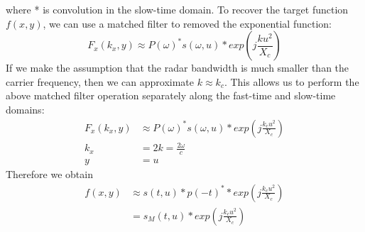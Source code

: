 \documentclass{article}
\begin{document}
where * is convolution in the slow-time domain. To recover the target function \( f(x,y) \), we can use a matched filter to removed the exponential function:
\begin{displaymath}
	F_{x}(k_{x} , y) \approx P(\omega)^{*} s(\omega , u) *exp\left(j \frac{k u^2 }{X_{c} }\right)
\end{displaymath}
If we make the assumption that the radar bandwidth is much smaller than the carrier frequency, then we can approximate \( k \approx k_{c} \). This allows us to perform the above matched filter operation separately along the fast-time and slow-time domains:
\begin{align*}
	F_{x}(k_{x} , y) &\approx P(\omega)^{*} s(\omega, u) * exp\left(j \frac{k_c u^2 }{X_{c} }\right)\\
	k_{x} &= 2k = \frac{2 \omega}{c} \\
	y &= u
\end{align*}
Therefore we obtain
\begin{align*}
	f(x,y) &\approx s(t,u) * p(-t)^{*} * exp\left(j \frac{k_c u^2 }{X_{c} }\right)\\
		   &= s_{M}(t,u) * exp\left(j \frac{k_c u^2 }{X_{c} }\right)
\end{align*}
\end{document}
